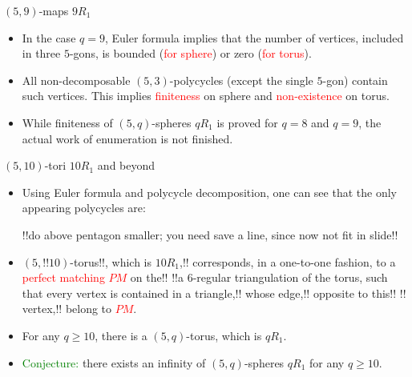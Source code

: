 \documentclass[%
pdf,
colorBG,
slideColor,
]{prosper}
\begin{document}
\begin{slide}{$(5,9)$-maps $9R_1$}
\begin{itemize}
\item In the case $q=9$, Euler formula implies that the number of 
vertices, included in three $5$-gons, is bounded 
(\textcolor{red}{for sphere}) or zero (\textcolor{red}{for torus}).
\item All non-decomposable $(5,3)$-polycycles (except the single 
$5$-gon) contain such vertices. 
This implies \textcolor{red}{finiteness} on sphere and \textcolor{red}{non-existence} on torus.
\item While finiteness of $(5,q)$-spheres $qR_1$ is proved for $q=8$ and 
$q=9$, the actual work of enumeration is not finished.
\end{itemize}
\end{slide}




\begin{slide}{$(5,10)$-tori $10R_1$ and beyond}

\begin{itemize}
\item Using Euler formula and polycycle decomposition, 
one can see that the only appearing polycycles are:
\begin{center}
\begin{minipage}{3.4cm}
\centering
{}\par
\end{minipage}
!!do above pentagon smaller; you need save a line, since now not fit in 
slide!!
\begin{minipage}{3.4cm}
\centering
{}\par
\end{minipage}
\end{center}
\item $(5,!!10)$-torus!!, which is $10R_1$,!! corresponds, in a one-to-one 
fashion, 
to a \textcolor{red}{perfect matching} \textcolor{red}{$PM$} on the!!
!!a 
$6$-regular triangulation of the torus, such that every vertex is contained in 
a triangle,!! whose edge,!! opposite to this!!
!!%
vertex,!! belong to 
\textcolor{red}{$PM$}.
\item For any $q\geq 10$, there is a $(5,q)$-torus, which is $qR_1$.
\item \textcolor{green}{Conjecture:} there exists an infinity of $(5,q)$-spheres $qR_1$ for any $q\geq 10$.
\end{itemize}

\end{slide}
\end{document}
